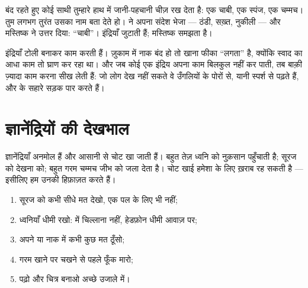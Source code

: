 \begin{example}[अँधेरे में नाम बताना]\label{ex:g1:the-five-senses:dark}
 बंद रहते हुए कोई साथी तुम्हारे हाथ में जानी-पहचानी चीज़ रख देता
है: एक चाबी, एक स्पंज, एक चम्मच। तुम लगभग तुरंत उसका नाम बता देते हो।
 ने अपना संदेश भेजा --- ठंडी, सख़्त, नुकीली --- और मस्तिष्क ने
उत्तर दिया: ``चाबी''। इंद्रियाँ जुटाती हैं; मस्तिष्क समझता है।
\end{example}

\begin{remark}[एक-दूसरे की मदद]\label{rem:g1:the-five-senses:together}
इंद्रियाँ टोली बनाकर काम करती हैं। ज़ुकाम में नाक बंद हो तो खाना फीका
``लगता'' है, क्योंकि स्वाद का आधा काम तो घ्राण कर रहा था। और जब कोई
एक इंद्रिय अपना काम बिलकुल नहीं कर पाती, तब बाक़ी ज़्यादा काम करना सीख
लेती हैं: जो लोग देख नहीं सकते वे उँगलियों के पोरों से, यानी स्पर्श
से पढ़ते हैं, और  के सहारे सड़क पार करते हैं।
\end{remark}

\section{ज्ञानेंद्रियों की देखभाल}

\begin{proposition}[नाज़ुक दरवाज़े]\label{prop:g1:the-five-senses:fragile}
ज्ञानेंद्रियाँ अनमोल हैं और आसानी से चोट खा जाती हैं। बहुत तेज़ ध्वनि
 को नुक़सान पहुँचाती है; सूरज को देखना  को; बहुत गरम चम्मच
जीभ को जला देता है। चोट खाई  हमेशा के लिए ख़राब रह सकती
है --- इसीलिए हम उनकी हिफ़ाज़त करते हैं।
\end{proposition}
\admitted

\begin{method}[अपनी इंद्रियों की हिफ़ाज़त]\label{met:g1:the-five-senses:protect}
\begin{enumerate}
  \item सूरज को कभी सीधे मत देखो, एक पल के लिए भी नहीं;
  \item ध्वनियाँ धीमी रखो:  में चिल्लाना नहीं, हेडफ़ोन धीमी आवाज़
        पर;
  \item अपने  या नाक में कभी कुछ मत ठूँसो;
  \item गरम खाने पर चखने से पहले फूँक मारो;
  \item पढ़ो और चित्र बनाओ अच्छे उजाले में।
\end{enumerate}
\end{method}

